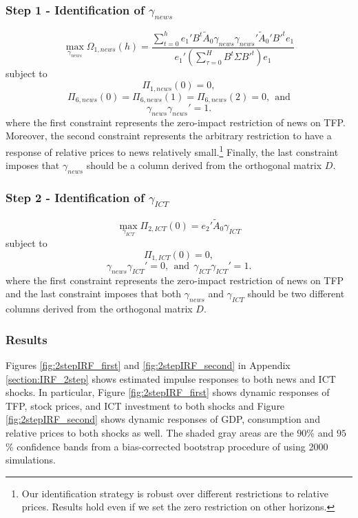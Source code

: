 \documentclass[12pt]{article}
\begin{document}
\subsubsection*{Step 1 - Identification of $\gamma_{news}$}
$$
\max_{\gamma_{news}} \Omega_{1,news}(h) = \frac{ \sum_{t=0}^h e_1' B^t \tilde{A}_0 \gamma_{news} \gamma_{news}' \tilde{A}_0' B'^t e_1 } {e_1' ( \sum_{\tau = 0}^H B^t \Sigma B'^t )e_1}
$$
subject to
$$
\Pi_{1,news}(0) = 0,
$$
$$
\Pi_{6,news}(0) = \Pi_{6,news}(1) = \Pi_{6,news}(2) = 0, \ \ \text{and}
$$
$$
\gamma_{news} \gamma_{news}' = 1.
$$
where the first constraint represents the zero-impact restriction of news on TFP. Moreover, the second constraint represents the arbitrary restriction to have a response of relative prices to news relatively small.\footnote{Our identification strategy is robust over different restrictions to relative prices. Results hold even if we set the zero restriction on other horizons.} Finally, the last constraint imposes that $\gamma_{news}$ should be a column derived from the orthogonal matrix $D$. 


\subsubsection*{Step 2 - Identification of $\gamma_{ICT}$}
$$
\max_{\gamma_{ICT}} \Pi_{2,ICT}(0) =  e_2' \tilde{A}_0 \gamma_{ICT} 
$$
subject to
$$
\Pi_{1,ICT}(0) = 0,
$$
$$
\gamma_{news} \gamma_{ICT}' = 0, \ \ \text{and} \ \ \gamma_{ICT} \gamma_{ICT}' = 1.
$$
where the first constraint represents the zero-impact restriction of news on TFP and the last constraint imposes that both $\gamma_{news}$ and $\gamma_{ICT}$ should be two different columns derived from the orthogonal matrix $D$.

\subsubsection*{Results}

Figures \ref{fig:2stepIRF_first} and \ref{fig:2stepIRF_second} in Appendix \ref{section:IRF_2step} shows estimated impulse responses to both news and ICT shocks. In particular, Figure \ref{fig:2stepIRF_first} shows dynamic responses of TFP, stock prices, and ICT investment to both shocks and Figure \ref{fig:2stepIRF_second} shows dynamic responses of GDP, consumption and relative prices to both shocks as well. The shaded gray areas are the $90$\% and $95$\% confidence bands from a bias-corrected bootstrap procedure of \cite{kilian1998small} using 2000 simulations. 
\end{document}
